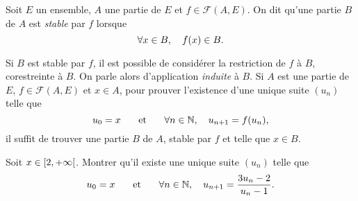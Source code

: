 \documentclass{magnoliaold}
\begin{document}
\begin{definition}
Soit $E$ un ensemble, $A$ une partie de $E$ et $f\in\mathcal{F}(A, E)$. On dit qu'une
partie $B$ de $A$ est \emph{stable} par $f$ lorsque
\[\forall x\in B,\quad f(x)\in B.\]
\end{definition}

\begin{remarques}
\remarque Si $B$ est stable par $f$, il est possible de considérer la restriction de
  $f$ à $B$, corestreinte à $B$. On parle alors d'application \emph{induite} à $B$.
\remarque Si $A$ est une partie de $E$, $f\in\mathcal{F}(A, E)$ et $x\in A$,
  pour prouver l'existence d'une unique suite $(u_n)$ telle que
\[u_0=x \quad\quad\!\text{et}\quad\!\quad \forall n\in\mathbb{N},\quad u_{n+1}=f(u_n),\]
  il suffit de trouver une partie $B$ de $A$, stable par $f$ et telle que
  $x\in B$.
\end{remarques}

\begin{exoUnique}
\exo Soit $x\in\left[2,+\infty\right[$. Montrer qu'il existe une unique suite $(u_n)$ telle que
  \[u_0= x \quad\quad\!\text{et}\quad\!\quad \forall n\in\mathbb{N},\quad u_{n+1}= \frac{3 u_n-2}{u_n-1}.\]
\end{exoUnique}






\end{document}
